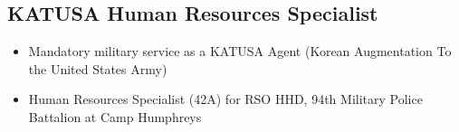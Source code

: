 \documentclass[10pt]{article}
\begin{document}
\subsection*{KATUSA Human Resources Specialist}
\begin{itemize}
  \item Mandatory military service as a KATUSA Agent
    (Korean Augmentation To the United States Army)
  \item Human Resources Specialist (42A) for RSO HHD,
    94th Military Police Battalion at Camp Humphreys
\end{itemize}








\end{document}
